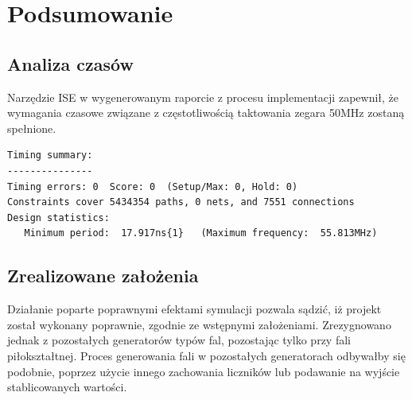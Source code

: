 \documentclass[12pt]{article}
\begin{document}
\section{Podsumowanie}
\subsection{Analiza czasów}
Narzędzie ISE w wygenerowanym raporcie z procesu implementacji zapewnił, że wymagania czasowe związane z częstotliwością taktowania zegara 50MHz zostaną spełnione.
\begin{lstlisting}
Timing summary: 
--------------- 
Timing errors: 0  Score: 0  (Setup/Max: 0, Hold: 0) 
Constraints cover 5434354 paths, 0 nets, and 7551 connections 
Design statistics: 
   Minimum period:  17.917ns{1}   (Maximum frequency:  55.813MHz) 
\end{lstlisting}

\subsection{Zrealizowane założenia}
Działanie poparte poprawnymi efektami symulacji pozwala sądzić, iż projekt został wykonany poprawnie, zgodnie ze wstępnymi założeniami. Zrezygnowano jednak z pozostałych generatorów typów fal, pozostając tylko przy fali piłokształtnej. Proces generowania fali w pozostałych generatorach odbywałby się podobnie, poprzez użycie innego zachowania liczników lub podawanie na wyjście stablicowanych wartości.
\end{document}
